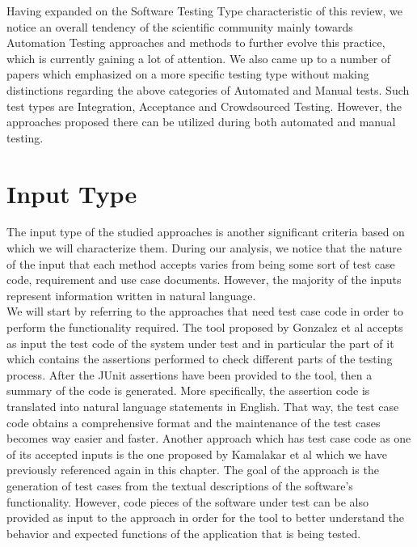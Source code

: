 Having expanded on the Software Testing Type characteristic of this review, we notice an overall tendency of the scientific community mainly towards Automation Testing approaches and methods to further 
evolve this practice, which is currently gaining a lot of attention. We also came up to a number of papers which emphasized on a more specific testing type without making distinctions regarding the 
above categories of Automated and Manual tests. Such test types are Integration, Acceptance and Crowdsourced Testing. However, the approaches proposed there can be utilized during both automated and manual testing.

\section{Input Type}
The input type of the studied approaches is another significant criteria based on which we will characterize them. During our analysis, we notice 
that the nature of the input that each method accepts varies from being some sort of test case code, requirement and use case documents. However, the 
majority of the inputs represent information written in natural language.\\

We will start by referring to the approaches that need test case code in order to perform the functionality required. The tool proposed by Gonzalez et al \cite{10.1145/3283812.3283819} accepts 
as input the test code of the system under test and in particular the part of it which contains the assertions performed to check different parts of the testing 
process. After the JUnit assertions have been provided to the tool, then a summary of the code is generated. More specifically, the assertion code 
is translated into natural language statements in English. That way, the test case code obtains a comprehensive format and the maintenance 
of the test cases becomes way easier and faster. Another approach which has test case code as one of its accepted inputs is the one proposed by 
Kamalakar et al \cite{kamalakar2013automatically} which we have previously referenced again in this chapter. The goal of the approach is the generation 
of test cases from the textual descriptions of the software's functionality. However, code pieces of the software under test can be also provided as input 
to the approach in order for the tool to better understand the behavior and expected functions of the application that is being tested.\\

